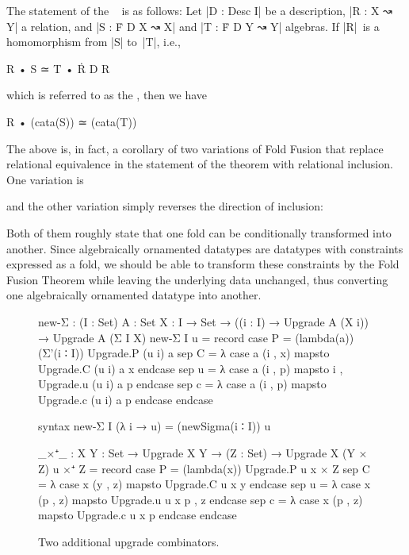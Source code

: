 The statement of the ~\cite[Section~6.2]{Bird-AoP} is as follows:
Let |D : Desc I| be a description, |R : X ↝ Y| a relation, and |S : Ḟ D X ↝ X| and |T : Ḟ D Y ↝ Y| algebras.
If |R|~is a homomorphism from |S| to~|T|, i.e.,
\begin{code}
R • S ≃ T • Ṙ D R
\end{code}
which is referred to as the , then we have
\begin{code}
R • (cata(S)) ≃ (cata(T))
\end{code}
The above is, in fact, a corollary of two variations of Fold Fusion that replace relational equivalence in the statement of the theorem with relational inclusion.
One variation is
and the other variation simply reverses the direction of inclusion:
Both of them roughly state that one fold can be conditionally transformed into another.
Since algebraically ornamented datatypes are datatypes with constraints expressed as a fold, we should be able to transform these constraints by the Fold Fusion Theorem while leaving the underlying data unchanged, thus converting one algebraically ornamented datatype into another.

\begin{figure}
\codefigure
\begin{code}
new-Σ :  (I : Set) {A : Set} {X : I → Set} →
         ((i : I) → Upgrade A (X i)) → Upgrade A (Σ I X)
new-Σ I u = record  case  P  = (lambda(a)) (Σ'(i ∶ I)) Upgrade.P (u i) a
                    sep   C  = λ case a (i , x) mapsto Upgrade.C (u i) a x      endcase
                    sep   u  = λ case a (i , p) mapsto i , Upgrade.u (u i) a p  endcase
                    sep   c  = λ case a (i , p) mapsto Upgrade.c (u i) a p      endcase endcase

syntax new-Σ I (λ i → u) = (newSigma(i ∶ I)) u

_×⁺_ : {X Y : Set} → Upgrade X Y → (Z : Set) → Upgrade X (Y × Z)
u ×⁺ Z = record  case  P  = (lambda(x)) Upgrade.P u x × Z
                 sep   C  = λ case x (y , z) mapsto Upgrade.C u x y      endcase
                 sep   u  = λ case x (p , z) mapsto Upgrade.u u x p , z  endcase
                 sep   c  = λ case x (p , z) mapsto Upgrade.c u x p      endcase endcase
\end{code}
\caption{Two additional upgrade combinators.}
\label{fig:fusion-upgrade-combinators}
\end{figure}

